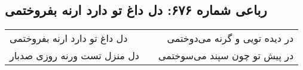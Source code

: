\begin{center}
\section*{رباعی شماره ۶۷۶: دل داغ تو دارد ارنه بفروختمی}
\label{sec:sh676}
\begin{longtable}{l p{0.5cm} r}
دل داغ تو دارد ارنه بفروختمی
&&
در دیده تویی و گرنه می‌دوختمی
\\
دل منزل تست ورنه روزی صدبار
&&
در پیش تو چون سپند می‌سوختمی
\\
\end{longtable}
\end{center}
